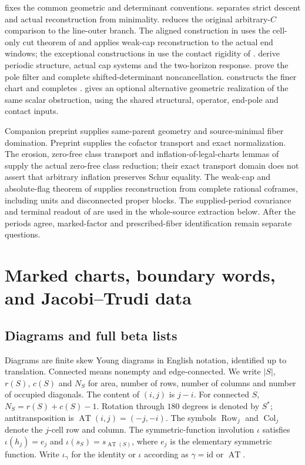 \documentclass[11pt,a4paper]{amsart}
\numberwithin{equation}{section}
\theoremstyle{plain}
\theoremstyle{definition}
\newcommand{\AT}{\operatorname{AT}}
\newcommand{\Row}{\operatorname{Row}}
\newcommand{\Col}{\operatorname{Col}}
\begin{document}
 fixes the common geometric and determinant conventions.
 separates strict descent and actual reconstruction from
minimality.   reduces the original arbitrary-\(C\)
comparison to the line-outer branch.
The aligned construction in  uses the cell-only cut
theorem of  and applies weak-cap reconstruction
\cite{Shields2026Coframes} to the actual end windows; the exceptional constructions in
 use the contact rigidity of
.
 derive periodic structure, actual cap systems
and the two-horizon response.   prove the pole
filter and complete shifted-determinant noncancellation.
 constructs the finer chart and completes .
 gives an optional alternative geometric
realization of the same scalar obstruction, using the shared
structural, operator, end-pole and contact inputs.

Companion preprint \cite{Shields2026Gluing} supplies same-parent geometry and
source-minimal fiber domination.  Preprint \cite{Shields2026CornerDescent} supplies
the cofactor transport and exact normalization.  The erosion, zero-free
class transport and inflation-of-legal-charts lemmas of
\cite{Shields2026Inflation} supply the actual zero-free class reduction;
their exact transport domain does not assert that arbitrary inflation
preserves Schur equality.  The weak-cap and absolute-flag theorem of
\cite{Shields2026Coframes} supplies reconstruction from complete rational
coframes, including units and disconnected proper blocks.
The supplied-period covariance and terminal readout of
\cite{Shields2026Readout} are used in the whole-source extraction below.
After the periods agree, marked-factor and prescribed-fiber
identification remain separate questions.


\section{Marked charts, boundary words, and Jacobi--Trudi data}\label{sec:charts}

\subsection{Diagrams and full beta lists}

Diagrams are finite skew Young diagrams in English notation, identified up to
translation.  Connected means nonempty and edge-connected.  We write \(|S|\),
\(r(S)\), \(c(S)\) and \(N_S\) for area, number of rows, number of columns and number
of occupied diagonals.  The content of \((i,j)\) is \(j-i\).  For connected \(S\),
\(N_S=r(S)+c(S)-1\).  Rotation through \(180\) degrees is denoted by \(S^*\);
antitransposition is \(\AT(i,j)=(-j,-i)\).  The symbols \(\Row_j\) and \(\Col_j\) denote the \(j\)-cell row and column.  The symmetric-function involution \(\iota\) satisfies \(\iota(h_j)=e_j\) and \(\iota(s_S)=s_{\AT(S)}\), where \(e_j\) is the elementary symmetric function.  Write \(\iota_\gamma\) for the identity or \(\iota\) according as \(\gamma=\mathrm{id}\) or \(\AT\).
\end{document}
